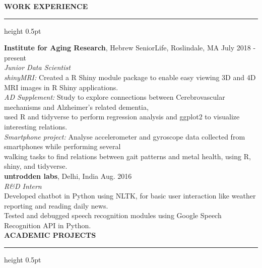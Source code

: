 \documentclass[a4paper]{article}
\newcommand{\myline}{\par
  \kern2pt %
  \hrule height 0.5pt
  \kern2pt %
}
\newcommand{\mybullet}{
	\indent \textbullet \hspace*{2mm}
}
\begin{document}
	\smallskip
	\smallskip
	\noindent
	{\large \textbf{WORK EXPERIENCE}}
	\myline 
	\smallskip
	
  \noindent
  \textbf{Institute for Aging Research}, Hebrew SeniorLife, Roslindale, MA 
  \hfill July 2018 - present\\
        \textit{Junior Data Scientist} \\
        \mybullet \textit{shinyMRI:} Created a R Shiny module package to enable easy viewing 3D 
				and 4D MRI images in R Shiny applications. \\
				\mybullet \textit{AD Supplement:} Study to explore connections between Cerebrovascular 
				mechanisms and Alzheimer's related dementia, \\ \hspace*{9mm} used R and tidyverse to 
				perform regression analysis and ggplot2 to visualize interesting relations. \\
				\mybullet \textit{Smartphone project:} Analyse accelerometer and gyroscope data collected 
				from smartphones while performing several \\ \hspace*{9mm} walking tasks to find 
				relations between gait patterns and metal health, using R, shiny, and tidyverse. \\

	\noindent
	\textbf{untrodden labs}, Delhi, India \hfill Aug. 2016 \\
        \textit{R\&D Intern}\\
        \mybullet Developed chatbot in Python using NLTK, for basic user interaction like 
        weather reporting and reading daily news. \\
        \mybullet Tested and debugged speech recognition modules using Google Speech 
        Recognition API in Python. \\
	
	
\noindent
{\large \textbf{ACADEMIC PROJECTS}}
\myline 
\smallskip
\end{document}
